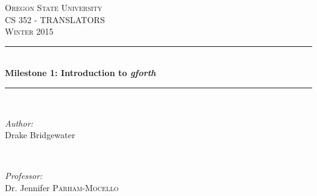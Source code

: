 \documentclass[letterpaper,10pt]{article}
\def\name{Drake Bridgewater }
\def\title{Milestone 1: Introduction to \textit{gforth}}
\def\subject{CS }
\def\courseNumber{352 }
\def\courseName{TRANSLATORS }
\def\courseInfo{Winter 2015 }%
\def\supervisor{Dr. Jennifer \textsc{Parham-Mocello }} %
\begin{document}
\begin{titlepage}

\newcommand{\HRule}{\rule{\linewidth}{0.5mm}} %

\center %
 

\textsc{\LARGE Oregon State University}\\[1.5cm] %
\textsc{\Large \subject \courseNumber - \courseName}\\[0.5cm] %
\textsc{\large \courseInfo}\\[1.5cm] %


\HRule \\[0.4cm]
{ \huge \bfseries \title }\\[0.4cm] %
\HRule \\[7.5cm]
 

\begin{minipage}{0.4\textwidth}
\begin{flushleft} \large
\emph{Author:}\\
\name
\end{flushleft}
\end{minipage}
~
\begin{minipage}{0.4\textwidth}
\begin{flushright} \large
\emph{Professor:} \\
\supervisor
\end{flushright}
\end{minipage}\\[4cm]



\end{titlepage}
\end{document}
